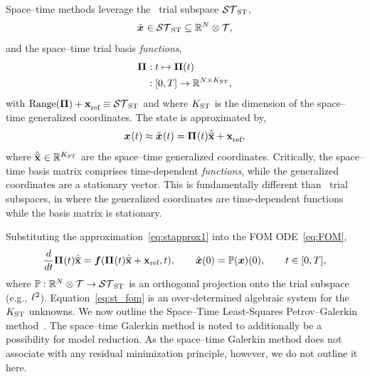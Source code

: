 \documentclass[3p,computermodern,10pt]{elsarticle}
\begin{document}
Space--time methods leverage the \spaceTimeAcronym\ trial subspace $\mathcal{ ST }_{\text{ST}}$,
\begin{equation}\label{eq:sttrialspace_def}
 \tilde{\boldsymbol x}^{} \in  \mathcal{ ST }_{\text{ST}} \subseteq \mathbb{R}^{N} \otimes \mathcal{T},
\end{equation}
and the space--time trial basis \textit{functions},
\begin{align*}
\stbasisArgnt{} &: t \mapsto \stbasis(t) \\
 &: [0,T] \rightarrow  \RR{N \times \stdim} ,%
\end{align*}
with $\text{Range}(\boldsymbol \Pi) + \mathbf{x}_\text{ref}^{} \equiv \mathcal{ ST }_{\text{ST}}$ and where $K_{\text{ST}}$ is the dimension of the space--time generalized coordinates.
The state is approximated by,
\begin{equation}\label{eq:stapprox1}
 {\boldsymbol x}^{}(t) \approx \tilde{\boldsymbol x}^{}(t)  = \boldsymbol \Pi^{}(t) \hat{\mathbf{\overline{x}}} + \mathbf{x}_\text{ref}^{},
\end{equation}
where $\hat{\mathbf{\overline{x}}}^{} \in \mathbb{R}^{K_{\text{ST}}}$ are the space--time generalized coordinates. Critically, the 
space--time basis matrix comprises time-dependent \textit{functions}, while the generalized coordinates are a stationary vector. This is fundamentally different than  
\spatialAcronym\ trial subspaces, in where the generalized coordinates are time-dependent functions while the basis matrix is stationary.  

Substituting the approximation~\eqref{eq:stapprox1} into the FOM ODE~\eqref{eq:FOM},
\begin{equation}\label{eq:st_fom}
\frac{d }{dt} \boldsymbol \Pi^{}(t) \hat{\mathbf{\overline{x}}} =  \boldsymbol f(\boldsymbol \Pi^{}(t) \hat{\mathbf{\overline{x}}} + \mathbf{x}_\text{ref},t) , \qquad \hat{ \boldsymbol x}(0) =\mathbb{P}({\boldsymbol x})(0), \qquad t \in [0,T],
\end{equation}
where $\mathbb{P} : \mathbb{R}^{N} \otimes \mathcal{T} \rightarrow \mathcal{ ST }_{\text{ST}}$ is an orthogonal projection onto the trial subspace (e.g., $\ell^2$).
Equation~\eqref{eq:st_fom} is an over-determined algebraic system for the $K_{\text{ST}}$ unknowns. We now outline the Space--Time Least-Squares Petrov--Galerkin method~\cite{choi_stlspg}. 
The space--time Galerkin method is noted to additionally be a possibility for model reduction. As the space--time Galerkin method does not associate with any residual minimization 
principle, however, we do not outline it here.
\end{document}
